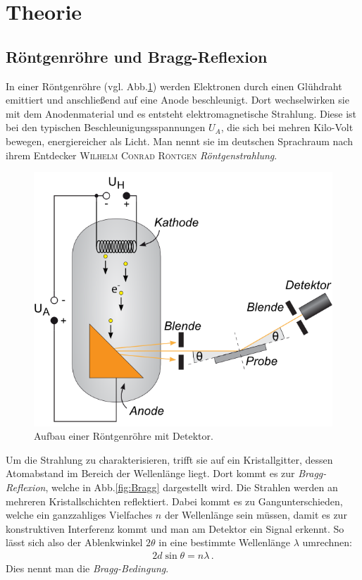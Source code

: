\documentclass[12pt,a4paper,titlepage,headinclude,bibtotoc]{scrartcl}
\begin{document}
\section{Theorie}
\label{sec:theorie}
\subsection{Röntgenröhre und Bragg-Reflexion}
In einer Röntgenröhre (vgl. Abb.\ref{fig:Aufbau}) werden Elektronen durch einen Glühdraht emittiert und anschließend auf eine Anode beschleunigt.
Dort wechselwirken sie mit dem Anodenmaterial und es entsteht elektromagnetische Strahlung.
Diese ist bei den typischen Beschleunigungsspannungen $U_A$, die sich bei mehren Kilo-Volt bewegen, energiereicher als Licht.
Man nennt sie im deutschen Sprachraum nach ihrem Entdecker \textsc{Wilhelm Conrad Röntgen} \emph{Röntgenstrahlung}. \\
\begin{figure}[!h]
	\centering
	\includegraphics[scale=0.7]{Aufbau.png}
	\caption{Aufbau einer Röntgenröhre mit Detektor. \cite[Datum: 02.01.15]{LP23}}
	\label{fig:Aufbau}
\end{figure}

Um die Strahlung zu charakterisieren, trifft sie auf ein Kristallgitter, dessen Atomabstand im Bereich der Wellenlänge liegt.
Dort kommt es zur \emph{Bragg-Reflexion}, welche in Abb.\ref{fig:Bragg} dargestellt wird.
Die Strahlen werden an mehreren Kristallschichten reflektiert.
Dabei kommt es zu Gangunterschieden, welche ein ganzzahliges Vielfaches $n$ der Wellenlänge sein müssen, damit es zur konstruktiven Interferenz kommt und man am Detektor ein Signal erkennt.
So lässt sich also der Ablenkwinkel $2\theta$ in eine bestimmte Wellenlänge $\lambda$ umrechnen:
\begin{align}
	2d\sin\theta=n\lambda\,.
	\label{eq:Bragg}
\end{align}
Dies nennt man die \emph{Bragg-Bedingung}.
\end{document}

